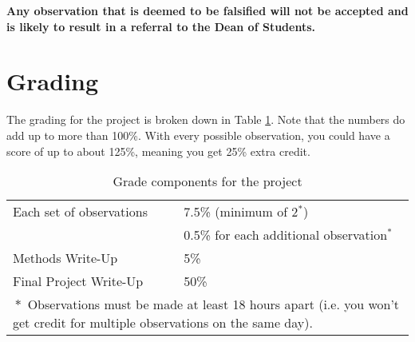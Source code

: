 \documentclass{exam}
\begin{document}
\textbf{Any observation that is deemed to be falsified will not be accepted and is likely to result in a referral to the Dean of Students.}


\section{Grading}
The grading for the project is broken down in Table \ref{tab:grading}. Note that the numbers do add up to more than 100\%. With every possible observation, %
you could have a score of up to about 125\%, meaning you get 25\% extra credit.

\begin{table}[!h]
\centering
\begin{tabular}{|ll|}
\hline
Each set of observations & 7.5\% (minimum of 2${}^*$)\\
& 0.5\% for each additional observation${}^*$\\
Methods Write-Up   & 5\%\\
Final Project Write-Up   & 50\%\\
\hline
\multicolumn{2}{p{14cm}}{${}*$ Observations must be made at least 18 hours apart (i.e. you won't get credit for multiple observations on the same day).}\\
\end{tabular}
\caption{\label{tab:grading}Grade components for the project}
\end{table}
\end{document}

